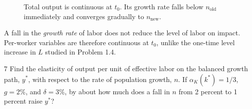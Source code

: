 \begin{solution}
\begin{figure}[H]
    \vspace{6pt}


    \par\vspace{4pt}
    \caption{Total output is continuous at \(t_0\). Its growth rate falls below
    \(n_{\mathrm{old}}\) immediately and converges gradually to
    \(n_{\mathrm{new}}\).}
\end{figure}
\end{solution}

\begin{note}[Continuity]
    A fall in the \emph{growth rate} of labor does not reduce the level of labor
    on impact. Per-worker variables are therefore continuous at \(t_0\), unlike
    the one-time level increase in \(L\) studied in Problem 1.4.
\end{note}

\begin{problem}{7}
Find the elasticity of output per unit of effective labor on the balanced growth path, \(y^*\),
with respect to the rate of population growth, \(n\). If \(\alpha_K\left(k^*\right)=1/3\),
\(g=2\%\), and \(\delta=3\%\), by about how much does a fall in \(n\) from 2 percent to
1 percent raise \(y^*\)?
\end{problem}

